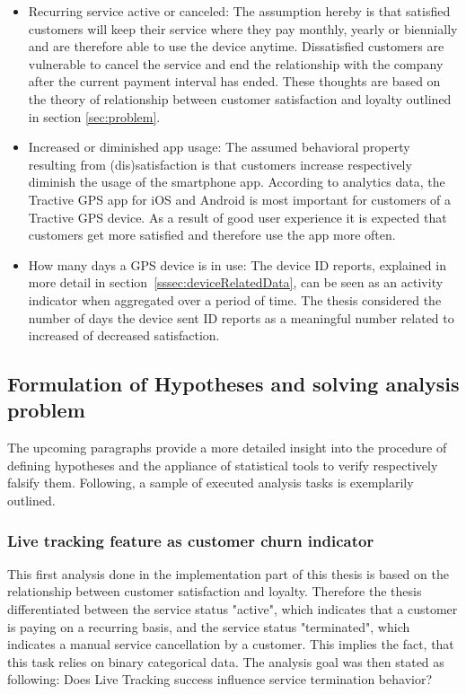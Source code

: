 \begin{itemize}
	\item Recurring service active or canceled: The assumption hereby is that satisfied customers will keep their service where they pay monthly, yearly or biennially and are therefore able to use the device anytime. Dissatisfied customers are vulnerable to cancel the service and end the relationship with the company after the current payment interval has ended. These thoughts are based on the theory of relationship between customer satisfaction and loyalty outlined in section \ref{sec:problem}.
	\item Increased or diminished app usage: The assumed behavioral property resulting from (dis)satisfaction is that customers increase respectively diminish the usage of the smartphone app. According to analytics data, the Tractive GPS app for iOS and Android is most important for customers of a Tractive GPS device. As a result of good user experience it is expected that customers get more satisfied and therefore use the app more often.
	\item How many days a GPS device is in use: The device ID reports, explained in more detail in section~\ref{sssec:deviceRelatedData}, can be seen as an activity indicator when aggregated over a period of time. The thesis considered the number of days the device sent ID reports as a meaningful number related to increased of decreased satisfaction.
\end{itemize}

\subsection{Formulation of Hypotheses and solving analysis problem}
The upcoming paragraphs provide a more detailed insight into the procedure of defining hypotheses and the appliance of statistical tools to verify respectively falsify them. Following, a sample of executed analysis tasks is exemplarily outlined. 

\subsubsection{Live tracking feature as customer churn indicator}
This first analysis done in the implementation part of this thesis is based on the relationship between customer satisfaction and loyalty. Therefore the thesis differentiated between the service status "active", which indicates that a customer is paying on a recurring basis, and the service status "terminated", which indicates a manual service cancellation by a customer. This implies the fact, that this task relies on binary categorical data. The analysis goal was then stated as following: Does Live Tracking success influence service termination behavior?

